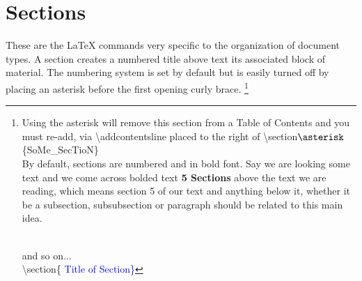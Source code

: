 \section{Sections}
These are the \LaTeX{} commands very specific to the organization 
of document types. A section creates a numbered title above text 
its associated block of material. The numbering system is set by 
default but is easily turned off by placing an asterisk before the 
first opening curly brace. \footnote{ Using the asterisk will remove 
this section from a Table of Contents and you must re-add, 
via \textbackslash{addcontentsline} placed to the right of  
\textbackslash{section}$\asterisk$\{SoMe\_SecTioN\} \\


By default, sections are numbered and in bold font. Say we are looking
some text and we come across bolded text \textbf{5 Sections} above the 
text we are reading, which means section 5 of our text and
anything below it, whether it be a subsection, subsubsection or 
paragraph should be related to this main idea.


\\

and so on...\\ 

\textbackslash{section}\{ \textcolor{blue}{Title of Section\}}} \\

